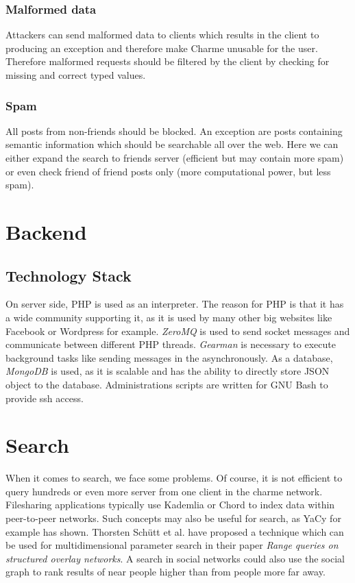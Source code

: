 \documentclass{scrartcl}
\begin{document}
      \subsubsection{Malformed data}
      Attackers can send malformed data to clients which results in the client to producing an exception and therefore make Charme unusable for the user. Therefore malformed requests should be filtered by the client by checking for missing and correct typed values.
      
      \subsubsection{Spam}
      All posts from non-friends should be blocked. An exception are posts containing semantic information which should be searchable all over the web. Here we can either expand the search to friends server (efficient but may contain more spam) or even check friend of friend posts only (more computational power, but less spam).
 \section{Backend}
\subsection{Technology Stack}
On server side, PHP is used as an interpreter. The reason for PHP is that it has a wide community supporting it, as it is used by many other big websites like Facebook or Wordpress for example. \textit{ZeroMQ} is used to send socket messages and communicate between different PHP threads. \textit{Gearman} is necessary to execute background tasks like sending messages in the asynchronously. As a database, \textit{MongoDB} is used, as it is scalable and has the ability to directly store JSON object to the database.
Administrations scripts are written for GNU Bash to provide ssh access.


  \section{Search}
  When it comes to search, we face some problems. Of course, it is not efficient to query hundreds or even more server from one client in the charme network. Filesharing applications typically use Kademlia  or Chord to index data within peer-to-peer networks. Such concepts may also be useful for search, as YaCy for example has shown. Thorsten Schütt et al. have proposed a technique which can be used for multidimensional parameter search in their paper \textit{Range queries on structured overlay networks}. A search in social networks could also use the social graph to rank results of near people higher than from people more far away.
  
\end{document}
